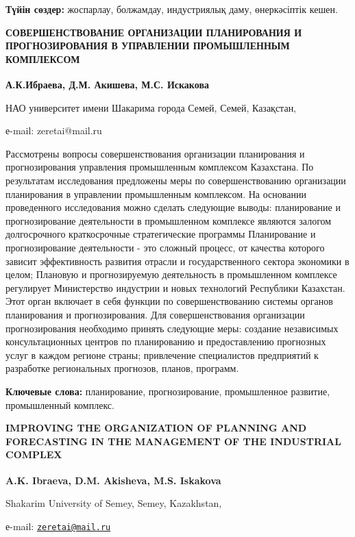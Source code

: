 {\bfseries Түйін сөздер:} жоспарлау, болжамдау, индустриялық даму,
өнеркәсіптік кешен.
\begin{articleheader}

{\bfseries СОВЕРШЕНСТВОВАНИЕ ОРГАНИЗАЦИИ ПЛАНИРОВАНИЯ И ПРОГНОЗИРОВАНИЯ В
УПРАВЛЕНИИ ПРОМЫШЛЕННЫМ КОМПЛЕКСОМ}

{\bfseries А.К.Ибраева\textsuperscript{\envelope }, Д.М. Акишева, М.С. Искакова}
\end{articleheader}
\begin{affiliation}

НАО университет имени Шакарима города Семей, Семей, Казақстан,

е-mail: zeretai@mail.ru
\end{affiliation}

Рассмотрены вопросы совершенствования организации планирования и
прогнозирования управления промышленным комплексом Казахстана. По
результатам исследования предложены меры по совершенствованию
организации планирования в управлении промышленным комплексом. На
основании проведенного исследования можно сделать следующие выводы:
планирование и прогнозирование деятельности в промышленном комплексе
являются залогом долгосрочного краткосрочные стратегические программы
Планирование и прогнозирование деятельности - это сложный процесс, от
качества которого зависит эффективность развития отрасли и
государственного сектора экономики в целом; Плановую и прогнозируемую
деятельность в промышленном комплексе регулирует Министерство индустрии
и новых технологий Республики Казахстан. Этот орган включает в себя
функции по совершенствованию системы органов планирования и
прогнозирования. Для совершенствования организации прогнозирования
необходимо принять следующие меры: создание независимых консультационных
центров по планированию и предоставлению прогнозных услуг в каждом
регионе страны; привлечение специалистов предприятий к разработке
региональных прогнозов, планов, программ.

{\bfseries Ключевые слова:} планирование, прогнозирование, промышленное
развитие, промышленный комплекс.
\begin{articleheader}

{\bfseries IMPROVING THE ORGANIZATION OF PLANNING AND FORECASTING IN THE
MANAGEMENT OF THE INDUSTRIAL COMPLEX}

{\bfseries A.K. Ibraeva\textsuperscript{\envelope }, D.M. Akisheva, M.S. Iskakova}
\end{articleheader}
\begin{affiliation}

Shakarim University of Semey, Semey, Kazakhstan,

е-mail: \href{mailto:zeretai@mail.ru}{\nolinkurl{zeretai@mail.ru}}
\end{affiliation}

